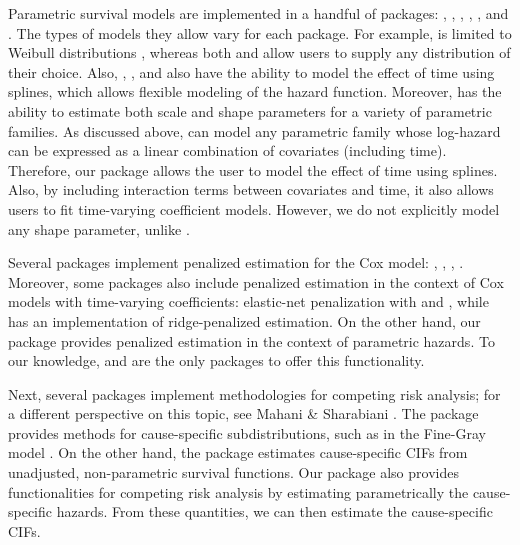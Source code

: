 \documentclass[
]{jss}
\begin{document}
Parametric survival models are implemented in a handful of packages:
 \citeyearpar{mahani2015bayesian}, 
\citeyearpar{flexsurv},  \citeyearpar{smoothHazard},
 \citeyearpar{clements_liu}, 
\citeyearpar{scheike2014estimating}, and 
\citeyearpar{survival-package}. The types of models they allow vary for
each package. For example,  is limited to Weibull
distributions \citeyearpar{smoothHazard}, whereas both 
and  allow users to supply any distribution of their
choice. Also, , ,  and
 also have the ability to model the effect of time using
splines, which allows flexible modeling of the hazard function.
Moreover,  has the ability to estimate both scale and
shape parameters for a variety of parametric families. As discussed
above,  can model any parametric family whose log-hazard
can be expressed as a linear combination of covariates (including time).
Therefore, our package allows the user to model the effect of time using
splines. Also, by including interaction terms between covariates and
time, it also allows users to fit time-varying coefficient models.
However, we do not explicitly model any shape parameter, unlike
.

Several packages implement penalized estimation for the Cox model:
 \citeyearpar{regpathcox}, 
\citeyearpar{park_hastie},  \citeyearpar{l1penal},
 \citeyearpar{gerds_blanche}. Moreover, some
packages also include penalized estimation in the context of Cox models
with time-varying coefficients: elastic-net penalization with
 \citeyearpar{perperoglou} and 
\citeyearpar{clements_liu}, while 
\citeyearpar{survival-package} has an implementation of ridge-penalized
estimation. On the other hand, our package  provides
penalized estimation in the context of parametric hazards. To our
knowledge,  and  are the only packages to
offer this functionality.

Next, several  packages implement methodologies for
competing risk analysis; for a different perspective on this topic, see
Mahani \& Sharabiani \citeyearpar{mahani2015bayesian}. The package
 provides methods for cause-specific subdistributions, such
as in the Fine-Gray model \citeyearpar{fine1999proportional}. On the
other hand, the package  estimates cause-specific CIFs from
unadjusted, non-parametric survival functions. Our package
 also provides functionalities for competing risk analysis
by estimating parametrically the cause-specific hazards. From these
quantities, we can then estimate the cause-specific CIFs.
\end{document}
